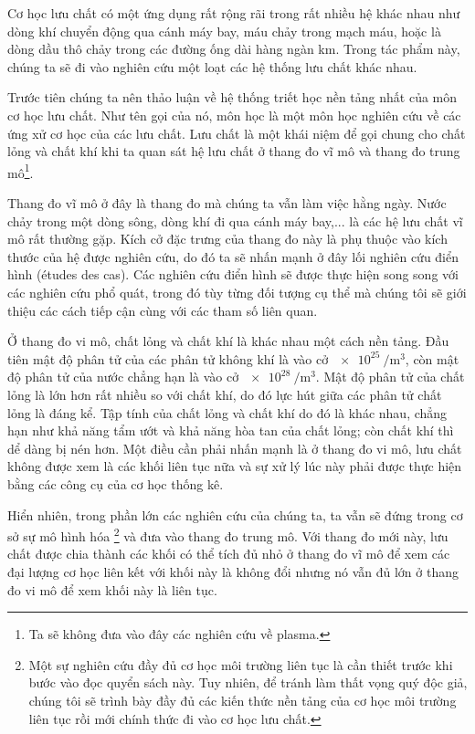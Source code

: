 \documentclass[../../../main.tex]{subfiles}
\begin{document}
    Cơ học lưu chất có một ứng dụng rất rộng rãi trong rất nhiều hệ khác nhau như dòng khí chuyển động qua cánh máy bay, máu chảy trong mạch máu, hoặc là dòng dầu thô chảy trong các đường ống dài hàng ngàn km. Trong tác phẩm này, chúng ta sẽ đi vào nghiên cứu một loạt các hệ thống lưu chất khác nhau.

    Trước tiên chúng ta nên thảo luận về hệ thống triết học nền tảng nhất của môn cơ học lưu chất. Như tên gọi của nó, môn học  là một môn học nghiên cứu về các ứng xử cơ học của các lưu chất. Lưu chất là một khái niệm để gọi chung cho chất lỏng và chất khí khi ta quan sát hệ lưu chất ở thang đo vĩ mô và thang đo trung mô\footnote{Ta sẽ không đưa vào đây các nghiên cứu về plasma.}.

    Thang đo vĩ mô ở đây là thang đo mà chúng ta vẫn làm việc hằng ngày. Nước chảy trong một dòng sông, dòng khí đi qua cánh máy bay,... là các hệ lưu chất vĩ mô rất thường gặp. Kích cở đặc trưng của thang đo này là phụ thuộc vào kích thước của hệ được nghiên cứu, do đó ta sẽ nhấn mạnh ở đây lối nghiên cứu điển hình (études des cas). Các nghiên cứu điển hình sẽ được thực hiện song song với các nghiên cứu phổ quát, trong đó tùy từng đối tượng cụ thể mà chúng tôi sẽ giới thiệu các cách tiếp cận cùng với các tham số liên quan.

    Ở thang đo vi mô, chất lỏng và chất khí là khác nhau một cách nền tảng. Đầu tiên mật độ phân tử của các phân tử không khí là vào cở $\SI{e25}{\per\metre\cubed}$, còn mật độ phân tử của nước chẳng hạn là vào cở $\SI{e28}{\per\metre\cubed}$. Mật độ phân tử của chất lỏng là lớn hơn rất nhiều so với chất khí, do đó lực hút giữa các phân tử chất lỏng là đáng kể. Tập tính của chất lỏng và chất khí do đó là khác nhau, chẳng hạn như khả năng tẩm ướt và khả năng hòa tan của chất lỏng; còn chất khí thì dể dàng bị nén hơn. Một điều cần phải nhấn mạnh là ở thang đo vi mô, lưu chất không được xem là các khối liên tục nữa và sự xử lý lúc này phải được thực hiện bằng các công cụ của cơ học thống kê.

    Hiển nhiên, trong phần lớn các nghiên cứu của chúng ta, ta vẫn sẽ đứng trong cơ sở sự mô hình hóa \footnote{Một sự nghiên cứu đầy đủ cơ học môi trường liên tục là cần thiết trước khi bước vào đọc quyển sách này. Tuy nhiên, để tránh làm thất vọng quý độc giả, chúng tôi sẽ trình bày đầy đủ các kiến thức nền tảng của cơ học môi trường liên tục rồi mới chính thức đi vào cơ học lưu chất.} và đưa vào thang đo trung mô. Với thang đo mới này, lưu chất được chia thành các khối có thể tích đủ nhỏ ở thang đo vĩ mô để xem các đại lượng cơ học liên kết với khối này là không đổi nhưng nó vẫn đủ lớn ở thang đo vi mô để xem khối này là liên tục.
        
\end{document}
